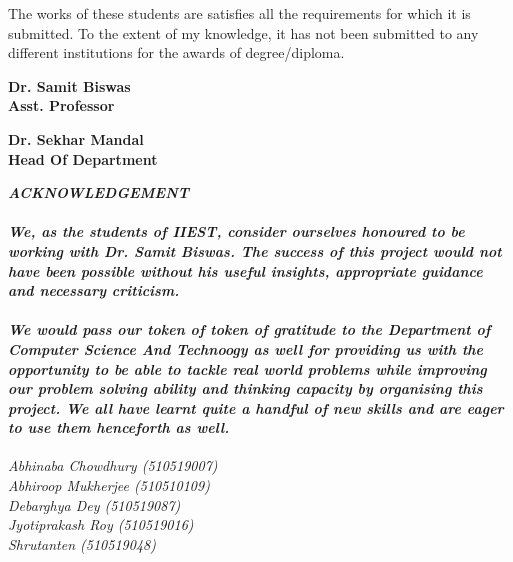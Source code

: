 \documentclass[a4paper]{article}
\begin{document}
\begin{titlepage}
    The works of these students are satisfies all the requirements for which it is submitted.
    To the extent of my knowledge, it has not been submitted to any different institutions for
    the awards of degree/diploma.

    \vspace{5cm}
    \begin{multicols}{2}
        \begin{center}
            \textbf{Dr. Samit Biswas\\Asst. Professor}\hspace{5cm}
        \end{center}
        \begin{center}
            \textbf{Dr. Sekhar Mandal\\Head Of Department}
        \end{center}
        \vspace{0.5cm}
    \end{multicols}
    \vfill
\end{titlepage}

\pagebreak
\newpage

\begin{titlepage}
    \begin{center}
        {\Large{\bf{\textit{ACKNOWLEDGEMENT}}\\[2cm]}}
    \end{center}


    \paragraph{\normalfont\textit{\indent We, as the students of IIEST, consider ourselves honoured to be working with Dr. Samit Biswas.
            The success of this project would not have been possible without his useful insights,
            appropriate guidance and necessary criticism.}}
    \paragraph{\normalfont\textit{\indent We would pass our token of token of gratitude to the Department of Computer Science And Technoogy as well for providing
            us with the opportunity to be able to tackle real world problems while improving
            our problem solving ability and thinking capacity by organising this project. We all have
            learnt quite a handful of new skills and are eager to use them henceforth as well.}}

    \begin{flushleft}
        \textit{Abhinaba Chowdhury (510519007)\\
            Abhiroop Mukherjee (510510109)\\
            Debarghya Dey (510519087)\\
            Jyotiprakash Roy (510519016)\\
            Shrutanten (510519048)}

    \end{flushleft}
\end{titlepage}
\end{document}
